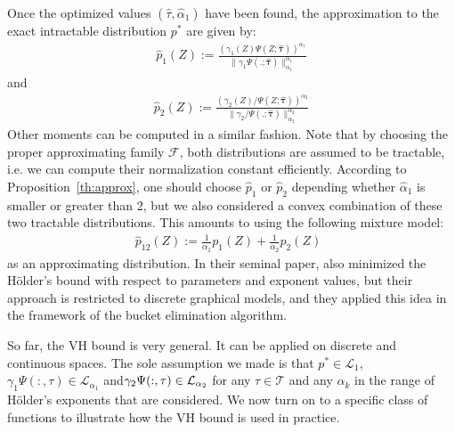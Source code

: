 \documentclass[reqno,oneside,letterpaper,10pt]{article}
\newcommand{\Holder}{H\"older\xspace}
\newcommand{\tauspace}{\mathcal{T}}
\def\btau{{\bm{\tau}}}
\def\proba{p}
\begin{document}
Once the optimized values $(\hat\tau,\hat\alpha_1)$ have been found, the approximation to the exact intractable distribution $\proba^*$ are given by:
\begin{eqnarray}
\hat\proba_1(Z) := \frac{(\gamma_1(Z)\Psi(Z;\hat\btau))^{\alpha_1}}{\|\gamma_1\Psi(.;\hat\btau)\|^{\alpha_1}_{\alpha_1}}
\end{eqnarray}
and 
\begin{eqnarray}
\hat\proba_2(Z) := \frac{(\gamma_2(Z)/\Psi(Z;\hat\btau))^{\alpha_2}}{\|\gamma_2/\Psi(.;\hat\btau)\|^{\alpha_2}_{\alpha_2}}
\end{eqnarray}
Other moments can be computed in a similar fashion. 
Note that by choosing the proper approximating family $\mathcal{F}$, both distributions are assumed to be tractable, i.e. we can compute their normalization constant efficiently.
According to Proposition~\ref{th:approx}, one should choose $\hat\proba_1$ or $\hat\proba_2$ depending whether $\hat\alpha_1$ is 
smaller or greater than 2, but we also considered a convex combination of these two tractable distributions. This amounts to using the 
following mixture model:
\begin{eqnarray}
\hat\proba_{12}(Z) := \frac {1}{\alpha_1}\proba_1(Z) + \frac {1}{\alpha_2}\proba_2(Z)
\enspace
\end{eqnarray}
as an approximating distribution.
In their seminal paper, \citet{liu11d} also minimized the \Holder's bound with respect to parameters and exponent values, but
their approach is restricted to %
 discrete graphical models, and they applied this idea in the framework of the bucket elimination algorithm.

So far, the VH bound is very general. It can be applied on discrete and continuous spaces. The sole assumption we made is that $\proba^*\in\mathcal{L}_1$, $\gamma_1\Psi(:,\tau)\in\mathcal{L}_{\alpha_1}$ and$\gamma_2\/\Psi(:,\tau)\in\mathcal{L}_{\alpha_2}$ for any $\tau\in\tauspace$ and any $\alpha_k$ in the
range of \Holder's exponents that are considered. We now turn on to a specific class of functions to illustrate how the VH bound is used in practice.

%
\end{document}
